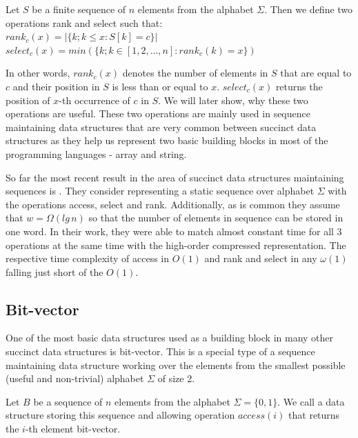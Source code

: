 \begin{definition}
Let $S$ be a finite sequence of $n$ elements from the alphabet $\Sigma$.
Then we define two operations rank and select such that: \\
$rank_c(x) = | \{k; k\leq x: S[k] = c  \} |$ \\
$select_c(x) = min (\{k; k \in [ 1, 2, \ldots, n] : rank_c(k)=x  \}) $
\end{definition}

In other words, $rank_c(x)$ denotes the number of elements in $S$ that are equal to $c$ and their position in $S$ is less than or equal to $x$. $select_c(x)$ returns the position of $x$-th occurrence of $c$ in $S$. We will later show, why these two operations are useful. These two operations are mainly used in sequence maintaining data structures that are very common between succinct data structures as they help us represent two basic building blocks in most of the programming languages - array and string.

So far the most recent result in the area of succinct data structures maintaining sequences is \cite{belazzougui2015optimal}. They consider representing a static sequence over alphabet $\Sigma$ with the operations access, select and rank. Additionally, as is common they assume that $w=\Omega(lg\,n)$ so that the number of elements in sequence can be stored in one word. In their work, they were able to match almost constant time for all 3 operations at the same time with the high-order compressed representation. The respective time complexity of access in $O(1)$ and rank and select in any $\omega(1)$ falling just short of the $O(1)$.

\subsection{Bit-vector}

One of the most basic data structures used as a building block in many other succinct data structures is bit-vector. This is a special type of a sequence maintaining data structure working over the elements from the smallest possible (useful and non-trivial) alphabet $\Sigma$ of size 2.

\begin{definition}
Let $B$ be a sequence of $n$ elements from the alphabet $\Sigma = \{0, 1\}$. We call a data structure storing this sequence
and allowing operation $access(i)$ that returns the $i$-th element bit-vector.
\end{definition}

